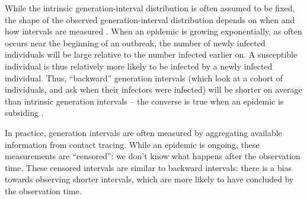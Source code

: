 \documentclass[12pt]{article}
\begin{document}
While the intrinsic generation-interval distribution is often assumed to be fixed, the shape of the observed generation-interval distribution depends on when and how intervals are measured \citep{kenah2008generation, nishiura2010time, tomba2010some, champredon2015intrinsic, britton2019estimation}. 
When an epidemic is growing exponentially, as often occurs near the beginning of an outbreak, the number of newly infected individuals will be large relative to the number infected earlier on. 
A susceptible individual is thus relatively more likely to be infected by a newly infected individual. 
Thus, ``backward'' generation intervals (which look at a cohort of individuals, and ask when their infectors were infected)  will be shorter on average than intrinsic generation intervals -- the converse is true when an epidemic is subsiding \citep{nishiura2010time, champredon2015intrinsic, britton2019estimation}.

In practice, generation intervals are often measured by aggregating available information from contact tracing. 
While an epidemic is ongoing, these measurements are ``censored'': we don't know what happens after the observation time.
These censored intervals are similar to backward intervals: there is a bias towards observing shorter intervals, which are more likely to have concluded by the observation time.
\end{document}
